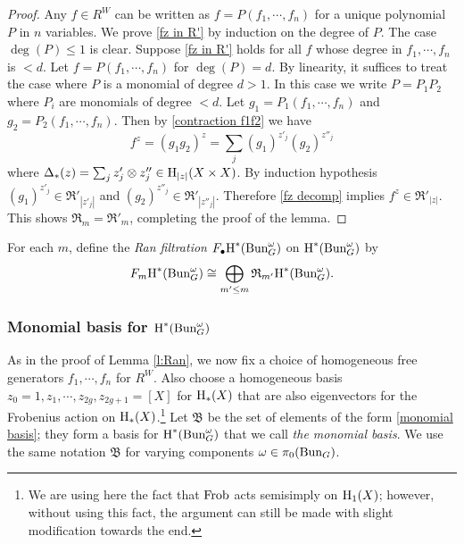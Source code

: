 \documentclass[reqno]{amsart}
\numberwithin{equation}{subsection}
\theoremstyle{definition}
\def\ZZ{\mathbb{Z}}
\newcommand\frB{\mathfrak{B}}
\newcommand\frR{\mathfrak{R}}
\newcommand{\Bun}{\textup{Bun}}
\newcommand\Frob{\textup{Frob}}
\newcommand{\Qlbar}{\overline{\Q}_\ell}
\newcommand{\bu}{\bullet}
\newcommand\ot{\otimes}
\newcommand{\homog}[2]{\textup{H}_{#1}({#2})}  %
\newcommand{\cohog}[2]{\textup{H}^{#1}({#2})}     %
\newcommand\D\Delta
\newcommand{\om}{\omega}
\newcommand{\Q}{\mathbf{Q}}
\begin{document}
\begin{proof}
    Any $f\in R^W$ can be written as  $f=P(f_1,\cdots, f_n)$ for a unique polynomial $P$ in $n$ variables. We prove \eqref{fz in R'} by induction on the degree of $P$. The case $\deg (P)\le 1$ is clear. Suppose \eqref{fz in R'} holds for all $f$ whose degree in $f_1,\cdots, f_n$ is $<d$. Let $f=P(f_1,\cdots, f_n)$ for $\deg(P)=d$. By linearity, it suffices to treat the case where $P$ is a monomial of degree $d>1$. In this case we write $P=P_1P_2$ where $P_i$ are monomials of degree $<d$. Let $g_1=P_1(f_1,\cdots, f_n)$ and $g_2=P_2(f_1,\cdots, f_n)$. Then by \eqref{contraction f1f2} we have
    \begin{equation}\label{fz decomp}
        f^z=(g_1g_2)^z=\sum_{j}(g_1)^{z'_j}(g_2)^{z''_j}
    \end{equation}
    where $\D_*(z)=\sum_jz'_j\ot z''_j\in \homog{|z|}{X\times X}$. By induction hypothesis $(g_1)^{z'_j}\in \frR'_{|z'_j|}$ and $(g_2)^{z''_j}\in \frR'_{|z''_j|}$. Therefore \eqref{fz decomp} implies $f^z\in \frR'_{|z|}$.  This shows $\frR_m=\frR'_m$, completing the proof of the lemma. 
\end{proof}


For each $m$, define the {\em Ran filtration} $F_\bu\cohog{*}{\Bun_G^\om}$ on $\cohog{*}{\Bun_G^\om}$ by
    \begin{equation}\label{eq:filtrant-ran-decomposition}
F_m\cohog{*}{\Bun_G^\om} \cong \bigoplus_{m'\le m}\frR_{m'}\cohog{*}{\Bun_G^\om}.
\end{equation}

\subsubsection{Monomial basis for $\cohog{*}{\Bun^\om_G}$} As in the proof of Lemma \ref{l:Ran}, we now fix a choice of homogeneous free generators $f_1,\cdots, f_n$ for $R^W$. Also choose a homogeneous basis $z_0=1,z_1,\cdots, z_{2g}, z_{2g+1}=[X]$ for $\homog{*}{X}$ that are also eigenvectors for the Frobenius action on $\homog{*}{X}$.\footnote{We are using here the fact that $\Frob$ acts semisimply on $\homog{1}{X}$; however, without using this fact, the argument can still be made with slight modification towards the end.} Let $\frB$ be the set of elements of the form \eqref{monomial basis}; they form a basis for $\cohog{*}{\Bun_G^\om}$ that we call \emph{the monomial basis}.
We use the same notation $\frB$ for varying components $\om\in \pi_0(\Bun_G)$.



    
\end{document}
